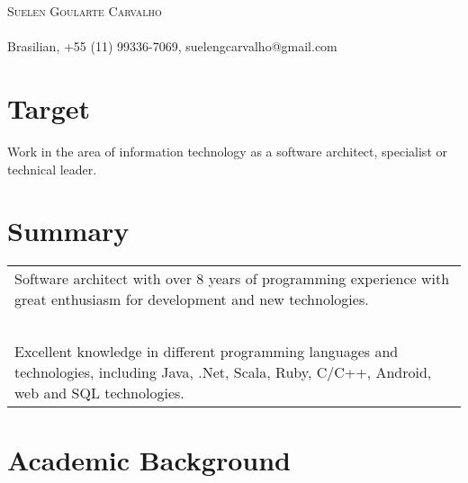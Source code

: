 \documentclass[a4paper, oneside, final]{scrartcl}
\begin{document}
\begin{center}
\textsc{\Huge{Suelen Goularte Carvalho}}\\
\ \\
Brasilian, +55 (11) 99336-7069, suelengcarvalho@gmail.com


\section{Target}
	Work in the area of information technology as a software architect, specialist or technical leader.



\section{Summary}

\begin{tabularx}{0.97\linewidth}{X}
	Software architect with over 8 years of programming experience with great enthusiasm for development and new technologies. \\ \ \\
	
	Excellent knowledge in different programming languages and technologies, including Java, .Net, Scala, Ruby, C/C++, Android, web and SQL technologies.
\end{tabularx}

\section{Academic Background}


\end{center}
\end{document}
